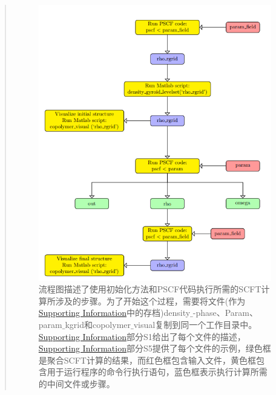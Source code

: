 \documentclass{article}
\begin{document}
\begin{CJK}{UTF8}{gkai}
\begin{quotation}
\begin{figure}[H]
	\includegraphics[scale=0.5]{./figures/23.png}
	\caption{流程图描述了使用初始化方法和PSCF代码执行所需的SCFT计算所涉及的步骤。为了开始这个过程，需要将文件(作为\href{http://pubs.acs.org/doi/suppl/10.1021/acs.macromol.6b00107/suppl_file/ma6b00107_si_001.pdf}{Supporting Information}中的存档)density$\_$-phase、Param、param$\_$kgrid和copolymer$\_$visual复制到同一个工作目录中。\href{http://pubs.acs.org/doi/suppl/10.1021/acs.macromol.6b00107/suppl_file/ma6b00107_si_001.pdf}{Supporting Information}部分S1给出了每个文件的描述，\href{http://pubs.acs.org/doi/suppl/10.1021/acs.macromol.6b00107/suppl_file/ma6b00107_si_001.pdf}{Supporting Information}部分S5提供了每个文件的示例，绿色框是聚合SCFT计算的结果，而红色框包含输入文件，黄色框包含用于运行程序的命令行执行语句，蓝色框表示执行计算所需的中间文件或步骤。}
	\label{figure3}
\end{figure}

\end{quotation}
\end{CJK}
\end{document}
